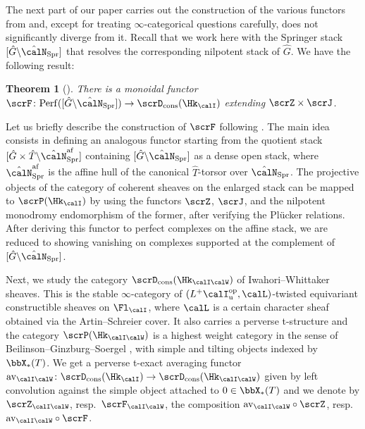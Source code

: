 \documentclass[10pt, reqno]{amsart}
\theoremstyle{plain}
\newtheorem{theorem}{Theorem}[section]
\theoremstyle{definition}
\numberwithin{equation}{section}
\begin{document}
	The next part of our paper carries out the construction of the various functors from \cite{AB09} and, except for treating $\infty$-categorical questions carefully, does not significantly diverge from it. Recall that we work here with the Springer stack $[\hat{G}\backslash\hat{\calN}_{\mathrm{Spr}}]$ that resolves the corresponding nilpotent stack of $\hat{G}$. We have the following result:
	
	\begin{theorem}[]
		There is a monoidal functor $\scrF\colon\mathrm{Perf}([\hat{G}\backslash \hat{\calN}_{\mathrm{Spr}}]) \to \scrD_{\mathrm{cons}}(\Hk_{\calI})$ extending $\scrZ\times\scrJ$.
	\end{theorem}
	
	Let us briefly describe the construction of $\scrF$ following \cite{AB09}. The main idea consists in defining an analogous functor starting from the quotient stack $[\hat{G}\times \hat{T}\backslash \hat{\calN}_{\mathrm{Spr}}^{\mathrm{af}}]$ containing $[\hat{G}\backslash \hat{\calN}_{\mathrm{Spr}}]$ as a dense open stack, where $\hat{\calN}_{\mathrm{Spr}}^{\mathrm{af}} $ is the affine hull of the canonical $\hat{T}$-torsor over $\hat{\calN}_{\mathrm{Spr}}$. The projective objects of the category of coherent sheaves on the enlarged stack can be mapped to $\scrP(\Hk_{{\calI}})$ by using the functors $\scrZ$, $\scrJ$, and the nilpotent monodromy endomorphism of the former, after verifying the Plücker relations. After deriving this functor to perfect complexes on the affine stack, we are reduced to showing vanishing on complexes supported at the complement of $[\hat{G}\backslash \hat{\calN}_{\mathrm{Spr}}]$.
	
	Next, we study the category $\scrD_{\mathrm{cons}}(\Hk_{\calI\calW})$ of Iwahori--Whittaker sheaves. This is the stable $\infty$-category of $(L^+\calI_{\mathrm{u}}^{\mathrm{op}},\calL)$-twisted equivariant constructible sheaves on $\Fl_{ \calI}$, where $\calL$ is a certain character sheaf obtained via the Artin--Schreier cover. It also carries a perverse t-structure and the category $\scrP(\Hk_{\calI\calW})$ is a highest weight category in the sense of Beilinson--Ginzburg--Soergel \cite{BGS96}, with simple and tilting objects indexed by $\bbX_\ast(T)$. We get a perverse t-exact averaging functor $\mathrm{av}_{\calI\calW}\colon \scrD_{\mathrm{cons}}(\Hk_{\calI}) \to \scrD_{\mathrm{cons}}(\Hk_{\calI\calW})$ given by left convolution against the simple object attached to $0\in \bbX_\ast(T)$ and we denote by $\scrZ_{\calI\calW}$, resp.~$\scrF_{\calI\calW}$, the composition $\mathrm{av}_{\calI\calW}\circ \scrZ$, resp.~$\mathrm{av}_{\calI\calW}\circ \scrF$.
	
\end{document}
